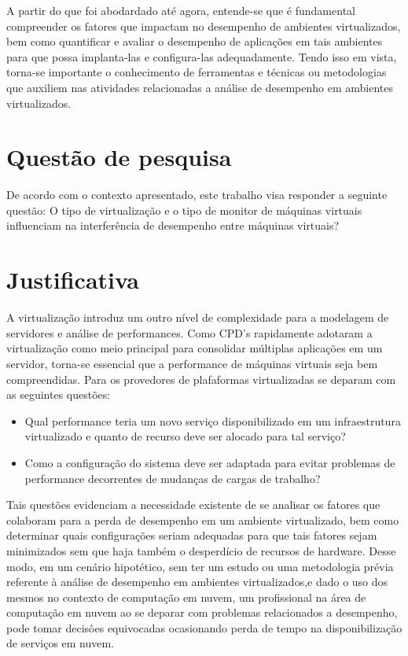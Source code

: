 A partir do que foi abodardado até agora, entende-se que é fundamental compreender os fatores que impactam no desempenho de ambientes virtualizados, bem como quantificar e avaliar o desempenho de aplicações em tais ambientes para que possa implanta-las e configura-las adequadamente. Tendo isso em vista, torna-se importante o conhecimento de ferramentas e técnicas ou metodologias que auxiliem nas atividades relacionadas a análise de desempenho em ambientes virtualizados. 

\section{Quest\~ao de pesquisa}
De acordo com o contexto apresentado, este trabalho visa responder a seguinte questão: O tipo de virtualização e o tipo de monitor de máquinas virtuais influenciam na interferência de desempenho entre máquinas virtuais? 

\section{Justificativa}
A virtualização introduz um outro nível de complexidade para a modelagem de servidores e análise de performances. Como CPD's rapidamente adotaram a virtualização como meio principal para consolidar múltiplas aplicações em um servidor, torna-se essencial que a performance de máquinas virtuais seja bem compreendidas\cite{ticko2010}. Para  os provedores de plafaformas virtualizadas se deparam com as seguintes questões:

\begin{itemize}
  \item Qual performance teria um novo serviço disponibilizado em um infraestrutura virtualizado e quanto de recurso deve ser alocado para tal serviço?

  \item Como a configuração do sistema deve ser adaptada para evitar problemas de performance decorrentes de mudanças de cargas de trabalho?
\end{itemize}


Tais questões evidenciam a necessidade existente de se analisar os fatores que colaboram para a perda de desempenho em um ambiente virtualizado, bem como determinar quais configurações seriam adequadas para que tais fatores sejam minimizados sem que haja também o desperdício de recursos de hardware. Desse modo, em um cenário hipotético, sem ter um estudo ou uma metodologia prévia referente à análise de desempenho em ambientes virtualizados,e dado o uso dos mesmos no contexto de computação em nuvem, um profissional na área de computação em nuvem ao se deparar com problemas relacionados a desempenho, pode tomar decisôes equivocadas ocasionando perda de tempo na disponibilização de serviços em nuvem.



